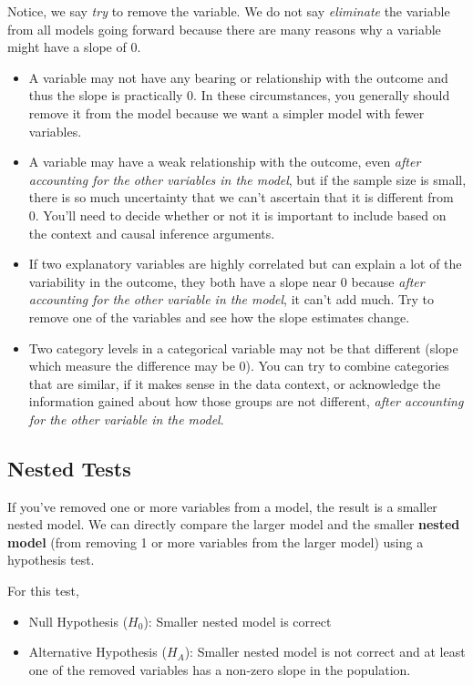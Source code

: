 \documentclass[
]{book}
\providecommand{\tightlist}{%
  \setlength{\itemsep}{0pt}\setlength{\parskip}{0pt}}
\begin{document}
Notice, we say \emph{try} to remove the variable. We do not say \emph{eliminate} the variable from all models going forward because there are many reasons why a variable might have a slope of 0.

\begin{itemize}
\tightlist
\item
  A variable may not have any bearing or relationship with the outcome and thus the slope is practically 0. In these circumstances, you generally should remove it from the model because we want a simpler model with fewer variables.
\item
  A variable may have a weak relationship with the outcome, even \emph{after accounting for the other variables in the model}, but if the sample size is small, there is so much uncertainty that we can't ascertain that it is different from 0. You'll need to decide whether or not it is important to include based on the context and causal inference arguments.
\item
  If two explanatory variables are highly correlated but can explain a lot of the variability in the outcome, they both have a slope near 0 because \emph{after accounting for the other variable in the model}, it can't add much. Try to remove one of the variables and see how the slope estimates change.
\item
  Two category levels in a categorical variable may not be that different (slope which measure the difference may be 0). You can try to combine categories that are similar, if it makes sense in the data context, or acknowledge the information gained about how those groups are not different, \emph{after accounting for the other variable in the model}.
\end{itemize}

\subsection{Nested Tests}\label{nested-tests}

If you've removed one or more variables from a model, the result is a smaller nested model. We can directly compare the larger model and the smaller \textbf{nested model} (from removing 1 or more variables from the larger model) using a hypothesis test.

For this test,

\begin{itemize}
\tightlist
\item
  Null Hypothesis (\(H_0\)): Smaller nested model is correct
\item
  Alternative Hypothesis (\(H_A\)): Smaller nested model is not correct and at least one of the removed variables has a non-zero slope in the population.
\end{itemize}
\end{document}
